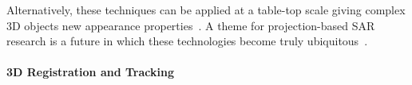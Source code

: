 \documentclass[10pt,twocolumn,letterpaper]{article}
\begin{document}
%
Alternatively, 
these techniques can be applied at a table-top scale
giving complex 3D objects
new appearance properties~\cite{Raskar2000}. 
%
%
A 
theme for 
projection-based SAR research is 
a future in which these 
technologies 
become
truly 
ubiquitous~\cite{Underkoffler1999,Pinhanez2001}.   




\vspace{-0.15in}
\paragraph{3D Registration and Tracking} 

\end{document}
